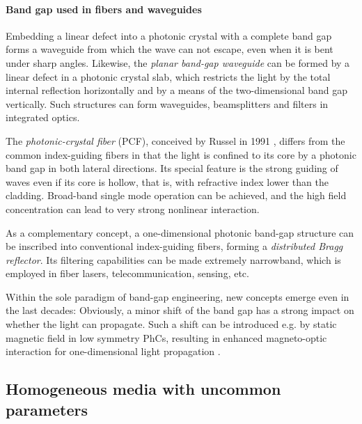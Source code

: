 \paragraph{Band gap used in fibers and waveguides} %
Embedding a linear defect into a photonic crystal with a complete band gap forms a waveguide from which the wave can not escape, even when it is bent under sharp angles.
Likewise, the \textit{planar band-gap waveguide} can be formed by a linear defect in a photonic crystal slab, which restricts the light by the total internal reflection horizontally and by a means of the two-dimensional band gap vertically. Such structures can form waveguides, beamsplitters and filters in integrated optics. 

The \textit{photonic-crystal fiber} (PCF), conceived by Russel in 1991 \cite{russell2007photonic}, differs from the common index-guiding fibers in that the light is confined to its core by a photonic band gap in both lateral directions. 
Its special feature is the strong guiding of waves even if its core is hollow, that is, with refractive index lower than the cladding. Broad-band single mode operation can be achieved, and the high field concentration can lead to very strong nonlinear interaction.

As a complementary concept, a one-dimensional photonic band-gap structure can be inscribed into conventional index-guiding fibers, forming a \textit{distributed Bragg reflector}. Its filtering capabilities can be made extremely narrowband, which is employed in fiber lasers, telecommunication, sensing, etc. %

Within the sole paradigm of band-gap engineering, new concepts emerge even in the last decades: Obviously, a minor shift of the band gap has a strong impact on whether the light can propagate. Such a shift can be introduced e.g. by static magnetic field in low symmetry PhCs, resulting in enhanced magneto-optic interaction for one-dimensional light propagation \cite{vanwolleghem2009unidirectional}.


\subsection{Homogeneous media with uncommon parameters} 
